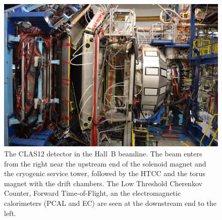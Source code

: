 \documentclass[final,3p]{elsarticle}
\begin{document}
\begin{twocolumn}
\begin{figure}[bhtp!]
\centerline{\includegraphics[width=1.4\columnwidth]{CLAS12_photo-1.jpg}}
\caption{The CLAS12 detector in the Hall~B beamline. The beam enters from the right near the upstream end of
  the solenoid magnet and the cryogenic service tower, followed by the HTCC and the torus magnet with the drift
  chambers. The Low Threshold Cherenkov Counter, Forward Time-of-Flight, an the electromagnetic calorimeters
  (PCAL and EC) are seen at the downstream end to the left.}
\label{clas12-photo}
\end{figure}


\end{twocolumn}
\end{document}
